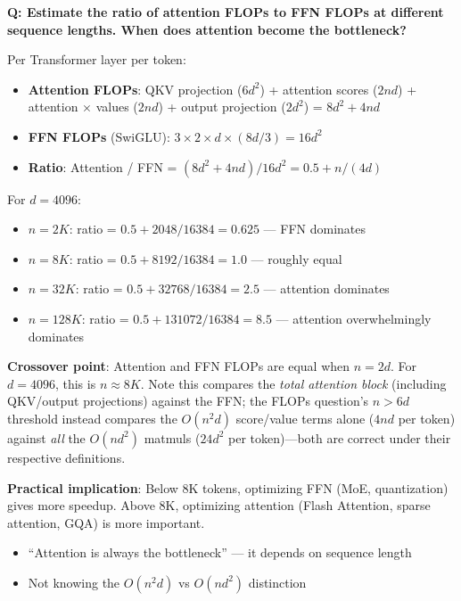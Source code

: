 \begin{interviewq}
\textbf{Q: Estimate the ratio of attention FLOPs to FFN FLOPs at different sequence lengths. When does attention become the bottleneck?}

 \quad {} \quad \badgefreq{\freqlow}

\stronganswer

Per Transformer layer per token:
\begin{itemize}
    \item \textbf{Attention FLOPs}: QKV projection ($6d^2$) + attention scores ($2nd$) + attention $\times$ values ($2nd$) + output projection ($2d^2$) = $8d^2 + 4nd$
    \item \textbf{FFN FLOPs} (SwiGLU): $3 \times 2 \times d \times (8d/3) = 16d^2$
    \item \textbf{Ratio}: Attention / FFN = $(8d^2 + 4nd) / 16d^2 = 0.5 + n/(4d)$
\end{itemize}

For $d = 4096$:
\begin{itemize}
    \item $n = 2K$: ratio = $0.5 + 2048/16384 = 0.625$ --- FFN dominates
    \item $n = 8K$: ratio = $0.5 + 8192/16384 = 1.0$ --- roughly equal
    \item $n = 32K$: ratio = $0.5 + 32768/16384 = 2.5$ --- attention dominates
    \item $n = 128K$: ratio = $0.5 + 131072/16384 = 8.5$ --- attention overwhelmingly dominates
\end{itemize}

\textbf{Crossover point}: Attention and FFN FLOPs are equal when $n = 2d$. For $d=4096$, this is $n \approx 8K$. Note this compares the \textit{total attention block} (including QKV/output projections) against the FFN; the FLOPs question's $n > 6d$ threshold instead compares the $O(n^2 d)$ score/value terms alone ($4nd$ per token) against \textit{all} the $O(nd^2)$ matmuls ($24d^2$ per token)---both are correct under their respective definitions.

\textbf{Practical implication}: Below 8K tokens, optimizing FFN (MoE, quantization) gives more speedup. Above 8K, optimizing attention (Flash Attention, sparse attention, GQA) is more important.

\redflags
\begin{itemize}
    \item ``Attention is always the bottleneck'' --- it depends on sequence length
    \item Not knowing the $O(n^2 d)$ vs $O(nd^2)$ distinction
\end{itemize}


\end{interviewq}
